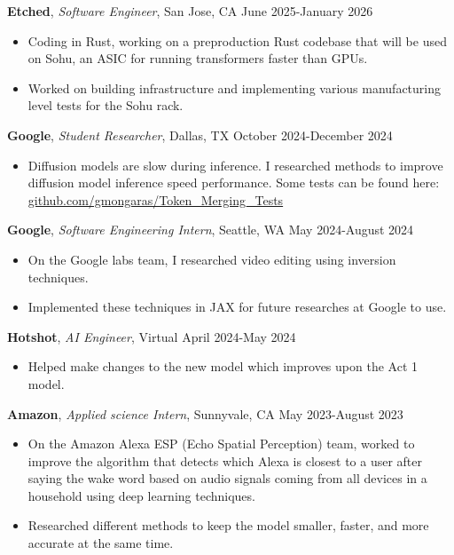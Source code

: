 \documentclass[a4paper,10pt]{article}
\begin{document}
\noindent\textbf{Etched}, \textit{Software Engineer}, San Jose, CA \hfill June 2025-January 2026
\begin{itemize}[noitemsep,topsep=0pt]
  \item Coding in Rust, working on a preproduction Rust codebase that will be used on Sohu, an ASIC for running transformers faster than GPUs.
  \item Worked on building infrastructure and implementing various manufacturing level tests for the Sohu rack.
\end{itemize}

\noindent\textbf{Google}, \textit{Student Researcher}, Dallas, TX \hfill October 2024-December 2024
\begin{itemize}[noitemsep,topsep=0pt]
  \item Diffusion models are slow during inference. I researched methods to improve diffusion model inference speed performance. Some tests can be found here: \href{https://github.com/gmongaras/Token_Merging_Tests}{github.com/gmongaras/Token\_Merging\_Tests}
\end{itemize}

\noindent\textbf{Google}, \textit{Software Engineering Intern}, Seattle, WA \hfill May 2024-August 2024
\begin{itemize}[noitemsep,topsep=0pt]
  \item On the Google labs team, I researched video editing using inversion techniques.
  \item Implemented these techniques in JAX for future researches at Google to use.
\end{itemize}

\noindent\textbf{Hotshot}, \textit{AI Engineer}, Virtual \hfill April 2024-May 2024
\begin{itemize}[noitemsep,topsep=0pt]
  \item Helped make changes to the new model which improves upon the Act 1 model.
\end{itemize}

\noindent\textbf{Amazon}, \textit{Applied science Intern}, Sunnyvale, CA \hfill May 2023-August 2023
\begin{itemize}[noitemsep,topsep=0pt]
  \item On the Amazon Alexa ESP (Echo Spatial Perception) team, worked to improve the algorithm that detects which Alexa is closest to a user after saying the wake word based on audio signals coming from all devices in a household using deep learning techniques.
  \item Researched different methods to keep the model smaller, faster, and more accurate at the same time.
\end{itemize}
\end{document}
